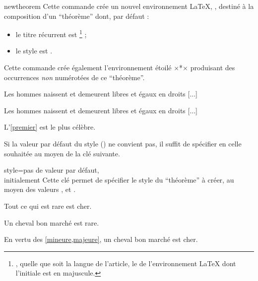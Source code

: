 \documentclass[french,nolocaltoc]{nwejmart}
\newtheorem{article}
\newtheorem[style=definition]{fait}
\newtheorem[title=contraventionnalisation]{ctrv}
\newtheorem[title-plural=anneaux]{anneau}
\newtheorem[title-plural=idéaux]{idéal}
\begin{document}
\begin{docCommand}{newtheorem}{}
  Cette commande crée un nouvel environnement \LaTeX{}, , destiné à la
  composition d'un \enquote{théorème} dont, par défaut :
  \begin{itemize}
  \item le titre récurrent est \footnote{\Ie*{}, quelle que soit la
      langue de l'article, le  de l'environnement \LaTeX{} dont
      l'initiale est en majuscule.} ;
  \item le style est .
  \end{itemize}
  Cette commande crée également l'environnement étoilé ×*× produisant
  des occurrences \emph{non} numérotées de ce \enquote{théorème}.

\begin{bodycode}[listing and text,listing options={deletekeywords={[2]article,label}}]
\begin{article*}
  Les hommes naissent et demeurent libres et égaux en droits [...]
\end{article*}
\begin{article}\label{premier}
  Les hommes naissent et demeurent libres et égaux en droits [...]
\end{article}
L'\vref{premier} est le plus célèbre.
\end{bodycode}

  Si la valeur par défaut du style () ne convient pas, il
  suffit de spécifier en  celle souhaitée au moyen de la clé
   suivante.
  \begin{docKey}{style}{=\textbar{}\textbar{}}{pas
      de valeur par défaut,\\initialement {}}
    Cette clé permet de spécifier le style du \enquote{théorème} à créer, au
    moyen des valeurs ,  et
    .
  \end{docKey}
\begin{bodycode}[listing and text,listing options={deletekeywords={[2]label}}]
\begin{fait}\label{majeure}
  Tout ce qui est rare est cher.
\end{fait}
\begin{fait}\label{mineure}
  Un cheval bon marché est rare.
\end{fait}
En vertu des \cref{mineure,majeure}, un cheval bon marché est
cher.
\end{bodycode}


\end{docCommand}
\end{document}
